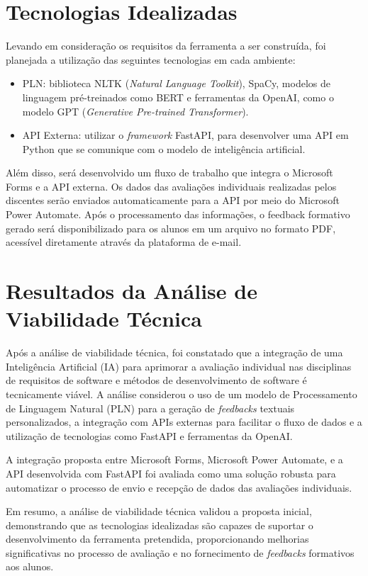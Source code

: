 \section{Tecnologias Idealizadas}

Levando em consideração os requisitos da ferramenta a ser construída, foi planejada a utilização das seguintes tecnologias em cada ambiente:

\begin{itemize}
  \item PLN: biblioteca NLTK (\textit{Natural Language Toolkit}), SpaCy, modelos de linguagem pré-treinados como BERT e ferramentas da OpenAI, como o modelo GPT (\textit{Generative Pre-trained Transformer}).
  \item API Externa: utilizar o \textit{framework} FastAPI, para desenvolver uma API em Python que se comunique com o modelo de inteligência artificial.
\end{itemize}

Além disso, será desenvolvido um fluxo de trabalho que integra o Microsoft Forms e a API externa. Os dados das avaliações individuais realizadas pelos discentes serão enviados automaticamente para a API por meio do Microsoft Power Automate. Após o processamento das informações, o feedback formativo gerado será disponibilizado para os alunos em um arquivo no formato PDF, acessível diretamente através da plataforma de e-mail.

\section{Resultados da Análise de Viabilidade Técnica}

Após a análise de viabilidade técnica, foi constatado que a integração de uma Inteligência Artificial (IA) para aprimorar a avaliação individual nas disciplinas de requisitos de software e métodos de desenvolvimento de software é tecnicamente viável. A análise considerou o uso de um modelo de Processamento de Linguagem Natural (PLN) para a geração de \textit{feedbacks} textuais personalizados, a integração com APIs externas para facilitar o fluxo de dados e a utilização de tecnologias como FastAPI e ferramentas da OpenAI.

A integração proposta entre Microsoft Forms, Microsoft Power Automate, e a API desenvolvida com FastAPI foi avaliada como uma solução robusta para automatizar o processo de envio e recepção de dados das avaliações individuais.

Em resumo, a análise de viabilidade técnica validou a proposta inicial, demonstrando que as tecnologias idealizadas são capazes de suportar o desenvolvimento da ferramenta pretendida, proporcionando melhorias significativas no processo de avaliação e no fornecimento de \textit{feedbacks} formativos aos alunos.